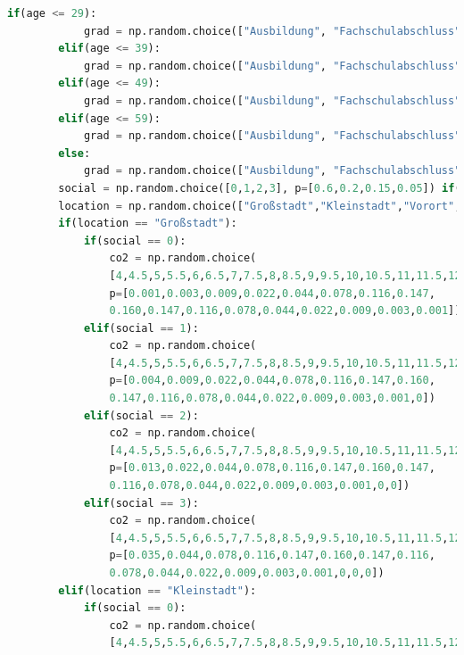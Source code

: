 \documentclass[a4paper,12pt]{report}
\begin{document}
\begin{lstlisting}[language=Python,label={lst:Sz2Z3},caption=Dritte Zelle für das Generieren der Daten]
        if(age <= 29):
            grad = np.random.choice(["Ausbildung", "Fachschulabschluss", "Bachelor", "Master", "Diplom", "Promotion","ohne"], p=[0.425,0.081,0.117,0.071,0.059,0.003,0.244])
        elif(age <= 39):
            grad = np.random.choice(["Ausbildung", "Fachschulabschluss", "Bachelor", "Master", "Diplom", "Promotion","ohne"], p=[0.452,0.091,0.059,0.052,0.157,0.016,0.173])
        elif(age <= 49):
            grad = np.random.choice(["Ausbildung", "Fachschulabschluss", "Bachelor", "Master", "Diplom", "Promotion","ohne"], p=[0.516,0.097,0.014,0.011,0.179,0.017,0.166])
        elif(age <= 59):
            grad = np.random.choice(["Ausbildung", "Fachschulabschluss", "Bachelor", "Master", "Diplom", "Promotion","ohne"], p=[0.559,0.113,0.005,0.003,0.159,0.014,0.147])
        else:
            grad = np.random.choice(["Ausbildung", "Fachschulabschluss", "Bachelor", "Master", "Diplom", "Promotion","ohne"], p=[0.544,0.096,0.002,0.001,0.132,0.012,0.213])
        social = np.random.choice([0,1,2,3], p=[0.6,0.2,0.15,0.05]) if(politics=="Mitte") else np.random.choice([0,1,2,3], p=[0.4,0.25,0.25,0.1]) if(politics=="Links") else np.random.choice([0,1,2,3], p=[0.75,0.15,0.09,0.01])
        location = np.random.choice(["Großstadt","Kleinstadt","Vorort","Ländlich"], p=[0.5952,0.266,0.085,0.0538])
        if(location == "Großstadt"):
            if(social == 0):
                co2 = np.random.choice(
                [4,4.5,5,5.5,6,6.5,7,7.5,8,8.5,9,9.5,10,10.5,11,11.5,12],
                p=[0.001,0.003,0.009,0.022,0.044,0.078,0.116,0.147,
                0.160,0.147,0.116,0.078,0.044,0.022,0.009,0.003,0.001])
            elif(social == 1):
                co2 = np.random.choice(
                [4,4.5,5,5.5,6,6.5,7,7.5,8,8.5,9,9.5,10,10.5,11,11.5,12],
                p=[0.004,0.009,0.022,0.044,0.078,0.116,0.147,0.160,
                0.147,0.116,0.078,0.044,0.022,0.009,0.003,0.001,0])
            elif(social == 2):
                co2 = np.random.choice(
                [4,4.5,5,5.5,6,6.5,7,7.5,8,8.5,9,9.5,10,10.5,11,11.5,12], 
                p=[0.013,0.022,0.044,0.078,0.116,0.147,0.160,0.147,
                0.116,0.078,0.044,0.022,0.009,0.003,0.001,0,0])
            elif(social == 3):
                co2 = np.random.choice(
                [4,4.5,5,5.5,6,6.5,7,7.5,8,8.5,9,9.5,10,10.5,11,11.5,12], 
                p=[0.035,0.044,0.078,0.116,0.147,0.160,0.147,0.116,
                0.078,0.044,0.022,0.009,0.003,0.001,0,0,0])
        elif(location == "Kleinstadt"):
            if(social == 0):
                co2 = np.random.choice(
                [4,4.5,5,5.5,6,6.5,7,7.5,8,8.5,9,9.5,10,10.5,11,11.5,12], 

\end{lstlisting}
\end{document}
